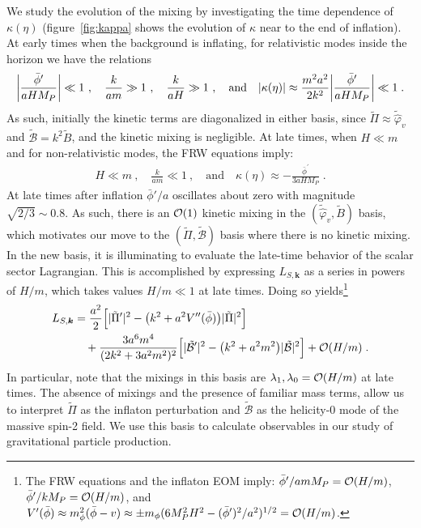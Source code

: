 \documentclass[11pt,a4paper]{article}
\newcommand{\ba}[1]{\begin{align} #1 \end{align}}
\newcommand{\bes}[1]{\begin{equation}\begin{split} #1 \end{split}\end{equation}}
\newcommand{\kvec}{{\bm k}}
\newcommand{\Mpl}{M_P}
\newcommand{\LSk}{L_{S,\kvec}}
\newcommand{\fref}[1]{figure~\ref{#1}}
\begin{document}
We study the evolution of the mixing by investigating the time dependence of $\kappa(\eta)$ (\fref{fig:kappa} shows the evolution of $\kappa$ near to the end of inflation).  At early times when the background is inflating,  for relativistic modes inside the horizon we have the relations 
\ba{
	\abs{ \frac{\bar{\phi}^\prime}{a H \Mpl} } \ll 1
	\ , \quad
	\frac{k}{a m} \gg 1
	\ , \quad
	\frac{k}{a H} \gg 1 
	\ , \quad \text{and} \quad 
	\abs{ \kappa(\eta) } \approx \frac{m^2 a^2}{2 k^2 } \abs{ \frac{\bar{\phi}^\prime}{a H \Mpl} } \ll 1
	\;.
}
As such, initially the kinetic terms are diagonalized in either basis, since $\tilde{\Pi} \approx \tilde{\hat{\varphi}}_v$ and $\tilde{\mathcal{B}} = k^2 \tilde{B}$, and the kinetic mixing is negligible.  At late times, when $H \ll m$ and for non-relativistic modes, the FRW equations imply:  
\ba{
	H \ll m
	\ , \quad 
	\frac{k}{a m} \ll 1
	\ , \quad \text{and} \quad 
	\kappa(\eta) \approx - \frac{\bar{\phi}^\prime}{3 a H \Mpl}
	\;.
}
At late times after inflation $\bar{\phi}'/a$ oscillates about zero with magnitude $\sqrt{2/3}\sim 0.8$. As such, there is an $\order{1}$ kinetic mixing in the $(\tilde{\hat{\varphi}}_v, \tilde{B})$ basis, which motivates our move to the $(\tilde{\Pi}, \tilde{\mathcal{B}})$ basis where there is no kinetic mixing. In the new basis, it is illuminating to evaluate the late-time behavior of the scalar sector Lagrangian.  This is accomplished by expressing $\LSk$ as a series in powers of $H/m$, which takes values $H/m \ll 1$ at late times.  Doing so yields\footnote{The FRW equations and the inflaton EOM imply: $\bar{\phi}^\prime / a m \Mpl = \order{H/m}$, $\bar{\phi}^\prime / k \Mpl = \order{H/m}$, and $V'(\bar{\phi}) \approx m_\phi^2 (\bar{\phi} - v) \approx \pm m_\phi (6 \Mpl^2 H^2 - (\bar{\phi}^\prime)^2 / a^2)^{1/2} = \order{H/m}$.}
\bes{
\label{eq:model1_LSk_diagonal_late}
    \LSk & =
    \frac{a^2}{2} \Big[ |\tilde{\Pi}'|^2 - \bigl( k^2 + a^2 V''(\bar{\phi}) \bigr) |\tilde{\Pi}|^2 \Big]
    \\ & \quad 
    + \frac{3 a^6 m^4}{(2 k^2 + 3 a^2 m^2)^2} \Big[ |\tilde{\mathcal{B}}'|^2 - \bigl( k^2 + a^2 m^2 \bigr) |\tilde{\mathcal{B}}|^2 \Big]
    + \order{H/m}
    \;.
}
In particular, note that the mixings in this basis are $\lambda_1, \lambda_0 = \order{H/m}$ at late times.  The absence of mixings and the presence of familiar mass terms, allow us to interpret $\tilde{\Pi}$ as the inflaton perturbation and $\tilde{\mathcal{B}}$ as the helicity-0 mode of the massive spin-2 field.  We use this basis to calculate observables in our study of gravitational particle production. 
\end{document}
